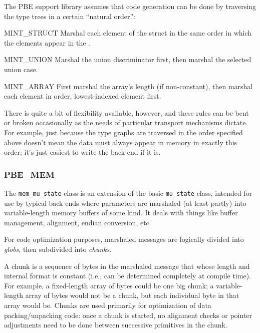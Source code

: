 The PBE support library assumes that code generation can be done by traversing
the type trees in a certain ``natural order'':

\begin{cidentifierlist}
  \item[MINT_STRUCT] Marshal each element of the struct in the same
  order in which the elements appear in the .

  \item[MINT_UNION] Marshal the union discriminator first, then
  marshal the selected union case.

  \item[MINT_ARRAY] First marshal the array's length (if
  non-constant), then marshal each element in order, lowest-indexed element
  first.
\end{cidentifierlist}

There is quite a bit of flexibility available, however, and these rules can be
bent or broken occasionally as the needs of particular transport mechanisms
dictate.  For example, just because the type graphs are traversed in the order
specified above doesn't mean the data must always appear in memory in exactly
this order; it's just easiest to write the back end if it is.


\subsubsection{PBE\_MEM}  %

The \texttt{mem\_mu\_state} class is an extension of the basic
\texttt{mu\_state} class, intended for use by typical back ends where
parameters are marshaled (at least partly) into variable-length memory buffers
of some kind.  It deals with things like buffer management, alignment, endian
conversion, etc.

For code optimization purposes, marshaled messages are logically divided into
\emph{globs}, then subdivided into \emph{chunks}.

A chunk is a sequence of bytes in the marshaled message that whose length and
internal format is constant (i.e., can be determined completely at compile
time).  For example, a fixed-length array of bytes could be one big chunk; a
variable-length array of bytes would not be a chunk, but each individual byte
in that array would be.  Chunks are used primarily for optimization of data
packing/unpacking code: once a chunk is started, no alignment checks or pointer
adjustments need to be done between successive primitives in the chunk.

